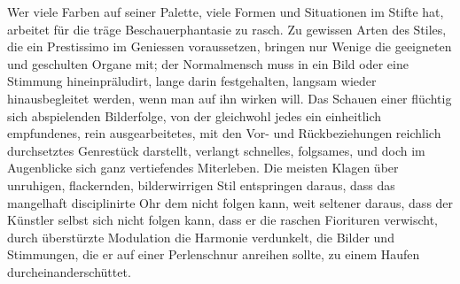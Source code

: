 Wer viele Farben auf seiner Palette, viele Formen und Situationen im Stifte hat, arbeitet für die träge Beschauerphantasie zu rasch. Zu gewissen Arten des Stiles, die ein Prestissimo im Geniessen voraussetzen, bringen nur Wenige die geeigneten und geschulten Organe mit; der Normalmensch muss in ein Bild oder eine Stimmung hineinpräludirt, lange darin festgehalten, langsam wieder hinausbegleitet werden, wenn man auf ihn wirken will. Das Schauen einer flüchtig sich abspielenden Bilderfolge, von der gleichwohl jedes ein einheitlich empfundenes, rein ausgearbeitetes, mit den Vor- und Rückbeziehungen reichlich durchsetztes Genrestück darstellt, verlangt schnelles, folgsames, und doch im Augenblicke sich ganz vertiefendes Miterleben. Die meisten Klagen über unruhigen, flackernden, bilderwirrigen Stil entspringen daraus, dass das mangelhaft disciplinirte Ohr dem  nicht folgen kann, weit seltener daraus, dass der Künstler selbst sich nicht folgen kann, dass er die raschen Fiorituren verwischt, durch überstürzte Modulation die Harmonie verdunkelt, die Bilder und Stimmungen, die er auf einer Perlenschnur anreihen sollte, zu einem Haufen durcheinanderschüttet.
\par

